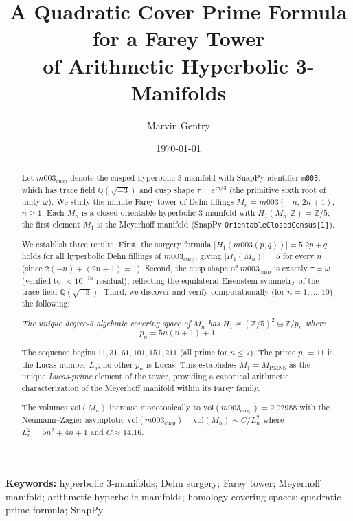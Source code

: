 \documentclass[11pt,a4paper]{article}
\theoremstyle{definition}
\newcommand{\ZZ}{\mathbb{Z}}
\newcommand{\QQ}{\mathbb{Q}}
\newcommand{\Zfive}{\ZZ/5}
\newcommand{\vol}{\mathrm{vol}}
\newcommand{\Mn}{M_n}
\newcommand{\Mcusp}{m003_{\mathrm{cusp}}}
\newcommand{\MPMNS}{M_{\mathrm{PMNS}}}
\begin{document}
\title{A Quadratic Cover Prime Formula for a Farey Tower\\
of Arithmetic Hyperbolic 3-Manifolds}

\author{Marvin Gentry}
\date{\today}

\maketitle

\begin{abstract}
Let $\Mcusp$ denote the cusped hyperbolic 3-manifold with
SnapPy identifier \texttt{m003}, which has trace field
$\QQ(\sqrt{-3})$ and cusp shape $\tau = e^{i\pi/3}$ (the primitive
sixth root of unity $\omega$).
We study the infinite Farey tower of Dehn fillings
$\Mn = m003(-n,\,2n+1)$, $n \geq 1$.
Each $\Mn$ is a closed orientable hyperbolic 3-manifold with
$H_1(\Mn;\ZZ) = \Zfive$; the first element $M_1$ is the Meyerhoff
manifold (SnapPy \texttt{OrientableClosedCensus[1]}).

We establish three results.
First, the surgery formula
$|H_1(m003(p,q))| = 5|2p+q|$
holds for all hyperbolic Dehn fillings of $\Mcusp$,
giving $|H_1(\Mn)| = 5$ for every $n$ (since $2(-n)+(2n+1) = 1$).
Second, the cusp shape of $\Mcusp$ is exactly $\tau = \omega$
(verified to $< 10^{-15}$ residual), reflecting the equilateral
Eisenstein symmetry of the trace field $\QQ(\sqrt{-3})$.
Third, we discover and verify computationally (for $n = 1,\ldots,10$)
the following:

\medskip
\emph{The unique degree-5 algebraic covering space of $\Mn$ has
$H_1 \cong (\Zfive)^2 \oplus \ZZ/p_n$ where
\[
  p_n = 5n(n+1)+1.
\]}

The sequence begins $11, 31, 61, 101, 151, 211$ (all prime for $n \leq 7$).
The prime $p_1 = 11$ is the Lucas number $L_5$; no other $p_n$ is Lucas.
This establishes $M_1 = \MPMNS$ as the unique \emph{Lucas-prime} element
of the tower, providing a canonical arithmetic characterization of the
Meyerhoff manifold within its Farey family.

The volumes $\vol(\Mn)$ increase monotonically to $\vol(\Mcusp) = 2.02988$
with the Neumann--Zagier asymptotic $\vol(\Mcusp) - \vol(\Mn) \sim C/L_n^2$
where $L_n^2 = 5n^2+4n+1$ and $C \approx 14.16$.
\end{abstract}

\medskip\noindent\textbf{Keywords:} hyperbolic 3-manifolds; Dehn surgery; Farey tower; Meyerhoff manifold; arithmetic hyperbolic manifolds; homology covering spaces; quadratic prime formula; SnapPy
\end{document}

